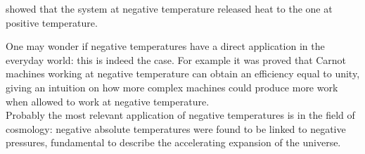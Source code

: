 showed that the system at negative temperature released heat to the one at positive temperature. \par 
One may wonder if negative temperatures have a direct application in the everyday world: this is indeed the case. For example it was proved that Carnot machines working at negative temperature can obtain an efficiency equal to unity, 
giving an intuition on how more complex machines could produce more work when allowed to work at negative temperature. \\
Probably the most relevant application of negative temperatures is in the field of cosmology: negative absolute temperatures were found to be linked to negative pressures, fundamental to describe the accelerating expansion of the universe.